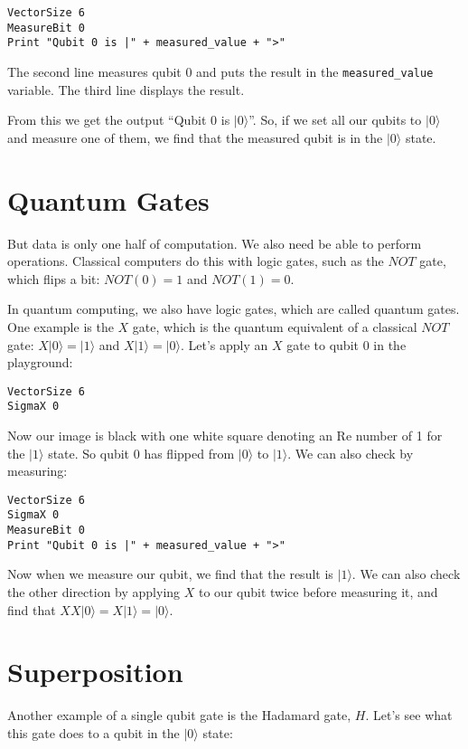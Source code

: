 \documentclass[twocolumn]{article}
\begin{document}
\begin{lstlisting}
VectorSize 6
MeasureBit 0
Print "Qubit 0 is |" + measured_value + ">"
\end{lstlisting}

The second line measures qubit $0$ and puts the result in the \texttt{measured\_value} variable. The third line displays the result.

From this we get the output ``Qubit $0$ is $|0\rangle$''. So, if we set all our qubits to $|0\rangle$ and measure one of them, we find that the measured qubit is in the $|0\rangle$ state.

\section{Quantum Gates}

But data is only one half of computation. We also need be able to perform operations. Classical computers do this with logic gates, such as the $NOT$ gate, which flips a bit: $NOT(0) = 1$ and $NOT(1) = 0$.

In quantum computing, we also have logic gates, which are called quantum gates. One example is the $X$ gate, which is the quantum equivalent of a classical $NOT$ gate: $X|0\rangle = |1\rangle$ and $X|1\rangle = |0\rangle$. Let's apply an $X$ gate to qubit $0$ in the playground:

\begin{lstlisting}
VectorSize 6
SigmaX 0
\end{lstlisting}

Now our image is black with one white square denoting an Re number of 1 for the $|1\rangle$ state. So qubit $0$ has flipped from $|0\rangle$ to $|1\rangle$. We can also check by measuring:

\begin{lstlisting}
VectorSize 6
SigmaX 0
MeasureBit 0
Print "Qubit 0 is |" + measured_value + ">"
\end{lstlisting}

Now when we measure our qubit, we find that the result is $|1\rangle$. We can also check the other direction by applying $X$ to our qubit twice before measuring it, and find that $XX|0\rangle = X|1\rangle = |0\rangle$.

\section{Superposition}
\label{sec:superposition}

Another example of a single qubit gate is the Hadamard gate, $H$. Let's see what this gate does to a qubit in the $|0\rangle$ state:
\end{document}
